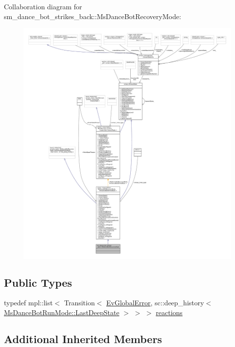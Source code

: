 Collaboration diagram for sm\+\_\+dance\+\_\+bot\+\_\+strikes\+\_\+back\+:\+:Ms\+Dance\+Bot\+Recovery\+Mode\+:
\nopagebreak
\begin{figure}[H]
\begin{center}
\leavevmode
\includegraphics[width=350pt]{classsm__dance__bot__strikes__back_1_1MsDanceBotRecoveryMode__coll__graph}
\end{center}
\end{figure}
\subsection*{Public Types}
\begin{DoxyCompactItemize}
\item 
typedef mpl\+::list$<$ Transition$<$ \hyperlink{structsm__dance__bot__strikes__back_1_1EvGlobalError}{Ev\+Global\+Error}, sc\+::deep\+\_\+history$<$ \hyperlink{classsmacc_1_1SmaccState_a60088405d2d99d468caa0baa3b2830a8}{Ms\+Dance\+Bot\+Run\+Mode\+::\+Last\+Deep\+State} $>$ $>$ $>$ \hyperlink{classsm__dance__bot__strikes__back_1_1MsDanceBotRecoveryMode_a65130a5e7f6d6179ea3651ee6c6d8b66}{reactions}
\end{DoxyCompactItemize}
\subsection*{Additional Inherited Members}



